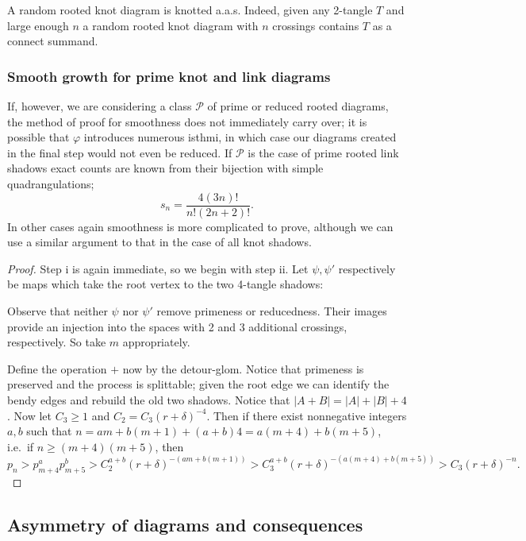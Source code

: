 \documentclass[amsmath,longbibliography,secnumarabic,floatfix,amssymb,nofootinbib,nobibnotes,letterpaper,11pt,notitlepage,preprint]{revtex4-1}
\newcommand{\PrimeShad}{\mathscr{P}}
\begin{document}
\begin{corollary}
  A random rooted knot diagram is knotted a.a.s. Indeed, given any 2-tangle $T$ and large enough $n$
  a random rooted knot diagram with $n$ crossings contains $T$ as a connect summand.
\end{corollary}

\subsubsection{Smooth growth for prime knot and link diagrams}
\label{sec:smoothprime}

If, however, we are considering a class $\PrimeShad$ of prime or reduced rooted diagrams, the method
of proof for smoothness does not immediately carry over; it is possible that $\varphi$ introduces
numerous isthmi, in which case our diagrams created in the final step would not even be reduced. If
$\PrimeShad$ is the case of prime rooted link shadows exact counts are known from their bijection
with simple quadrangulations;
\[ s_n = \frac{4(3n)!}{n!(2n + 2)!}.\]
In other cases again smoothness is more complicated to prove, although we can use a similar argument
to that in the case of all knot shadows.

\begin{proof}
  Step i is again immediate, so we begin with step ii. Let $\psi, \psi'$ respectively be maps which
  take the root vertex to the two 4-tangle shadows:

  Observe that neither $\psi$ nor $\psi'$ remove primeness or reducedness. Their images provide an
  injection into the spaces with 2 and 3 additional crossings, respectively. So take $m$
  appropriately.

  Define the operation $+$ now by the detour-glom. Notice that primeness is preserved and the
  process is splittable; given the root edge we can identify the bendy edges and rebuild the old two
  shadows. Notice that $|A + B| = |A| + |B| + 4$. Now let $C_3 \ge 1$ and $C_2 = C_3(r +
  \delta)^{-4}$. Then if there exist nonnegative integers $a, b$ such that $n = am + b(m+1) + (a+b)4
  = a(m + 4) + b(m+5)$, i.e.\ if $n \ge (m+4)(m+5)$, then
  \[ p_n > p_{m+4}^ap_{m+5}^b > C_2^{a+b}(r+\delta)^{-(am+b(m+1))} > C_3^{a+b}(r+\delta)^{-(a(m+4) + b(m+5))}
  > C_3(r+\delta)^{-n}.\]
\end{proof}

\subsection{Asymmetry of diagrams and consequences}
\label{sec:asymmetry}
\end{document}
